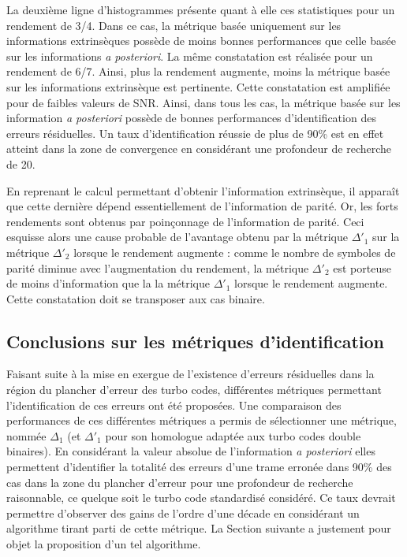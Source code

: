 La deuxième ligne d'histogrammes présente quant à elle ces statistiques  pour un rendement de 3/4. Dans ce cas, la 
métrique basée uniquement sur les informations extrinsèques possède de moins bonnes performances que celle basée sur les 
informations \textit{a posteriori}. La même constatation est réalisée pour un rendement de 6/7. Ainsi, plus la rendement 
augmente, moins la métrique basée sur les informations extrinsèque est pertinente. Cette constatation est amplifiée pour 
de faibles valeurs de SNR. Ainsi, dans tous les cas, la métrique basée sur les information \textit{a posteriori} 
possède de bonnes performances d'identification des erreurs résiduelles. Un taux d'identification réussie de plus de 
90\% est en effet atteint dans la zone de convergence en considérant une profondeur de recherche de 20. 

En reprenant le calcul permettant d'obtenir l'information extrinsèque, il apparaît que cette dernière dépend 
essentiellement de l'information de parité. Or, les forts rendements sont obtenus par poinçonnage 
de l'information de parité. Ceci esquisse alors une cause probable de l'avantage obtenu par la métrique $\Delta'_1$ sur 
la métrique $\Delta'_2$ lorsque le rendement augmente : comme le nombre de symboles de parité diminue avec l'augmentation 
du rendement, la métrique $\Delta'_2$ est porteuse de moins d'information que la la métrique $\Delta'_1$ lorsque le 
rendement augmente. Cette constatation doit se transposer aux cas binaire.

\subsection{Conclusions sur les métriques d'identification}
Faisant suite à la mise en exergue de l'existence d'erreurs résiduelles dans la région du plancher d'erreur des turbo codes,
différentes métriques permettant l'identification de ces erreurs ont été proposées. Une comparaison des performances de ces 
différentes métriques a permis de sélectionner une métrique, nommée $\Delta_1$ (et $\Delta'_1$ pour son homologue 
adaptée aux turbo codes double binaires). En considérant la valeur absolue de l'information \textit{a posteriori}
elles permettent d'identifier la totalité des erreurs d'une trame erronée dans 90\% des cas dans la zone du plancher 
d'erreur pour une profondeur de recherche raisonnable, ce quelque soit le turbo code standardisé considéré. Ce taux devrait
permettre d'observer des gains de l'ordre d'une décade en considérant un algorithme tirant parti de cette métrique. 
La Section suivante a justement pour 
objet la proposition d'un tel algorithme.


